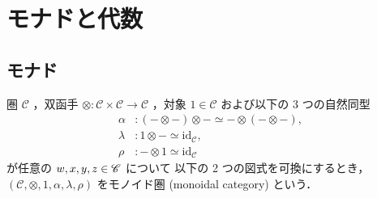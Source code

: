 \documentclass[titlepage]{ltjsreport}
\newcommand{\cat}[1]{\mathscr{#1}}
\newcommand{\obj}[1]{\lowercase{#1}}
\newcommand{\objs}[1]{#1}
\newcommand{\mrp}[3]{{#1}:{#2}\to{#3}}
\newcommand{\id}[1]{\mathrm{id}_{#1}}
\begin{document}
{

  \def\C{\cat{C}}%
  \def\D{\cat{D}}%
  \def\E{\cat{E}}%
  \def\i{1}%
  \def\F{F}%
  \def\G{G}%
  \def\w{\obj{w}}%
  \def\x{\obj{x}}%
  \def\y{\obj{y}}%
  \def\z{\obj{z}}%
  \def\monad{M}%

  \chapter{モナドと代数}

  \section{モナド}

  \begin{definition}[モノイド圏]
    圏 $\C$ ，双函手 $\mrp{\otimes}{\C\times\C}{\C}$ ，対象 $\i\in\objs{\C}$
    および以下の 3 つの自然同型
    \begin{align}
      \alpha  & :(-\otimes-)\otimes-\simeq-\otimes(-\otimes-), \\
      \lambda & :\i\otimes-\simeq\id{\C},                      \\
      \rho    & :-\otimes\i\simeq\id{\C}
    \end{align}
    が任意の $\w,\x,\y,\z\in\objs{\C}$ について
    以下の 2 つの図式を可換にするとき，
    $(\C,\otimes,\i,\alpha,\lambda,\rho)$
    をモノイド圏 (monoidal category) という．
    \begin{center}
    \end{center}
    \begin{center}
    \end{center}
  \end{definition}

}
\end{document}
